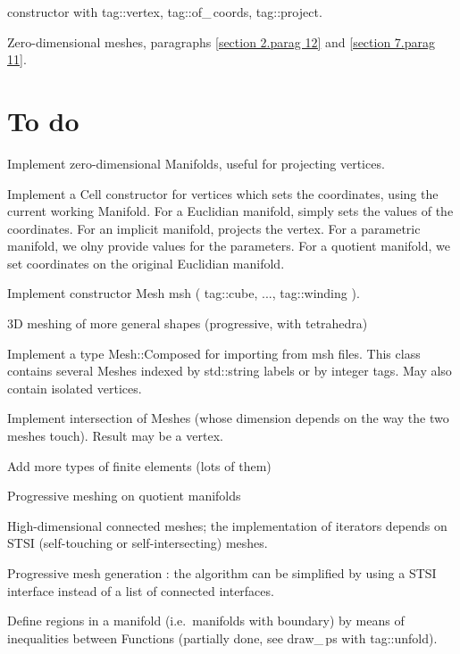 \documentclass[a4paper]{scrreprt}
\def\numb{}
\newcommand\azul[1]{\textcolor{nova}{#1}}
\newcommand\verm[1]{\textcolor{manif}{#1}}
\renewcommand\tt{\normalfont\ttfamily}
\begin{document}
\noindent {\small\tt\verm{Cell}} constructor with {\small\tt\textcolor{tag}{tag}::vertex},
{\small\tt\textcolor{tag}{tag}::of\_\,coords}, {\small\tt\textcolor{tag}{tag}::project}.

\noindent Zero-dimensional meshes, paragraphs \ref{\numb section 2.\numb parag 12} and
\ref{\numb section 7.\numb parag 11}.


\section*{To do}

Implement zero-dimensional {\small\tt\verm{Manifold}}s, useful for projecting vertices.

Implement a {\small\tt\verm{Cell}} constructor for vertices which sets the coordinates,
using the current working {\small\tt\verm{Manifold}}.
For a Euclidian manifold, simply sets the values of the coordinates.
For an implicit manifold, projects the vertex.
For a parametric manifold, we olny provide values for the parameters.
For a quotient manifold, we set coordinates on the original Euclidian manifold.

\noindent Implement constructor {\small\tt\verm{Mesh}} {\small\tt \azul{msh}} {\small\tt (}
{\small\tt\textcolor{tag}{tag}::cube,} {\small\tt ...,} {\small\tt\textcolor{tag}{tag}::winding}
{\small\tt )}.

\noindent 3D meshing of more general shapes (progressive, with tetrahedra)

\noindent Implement a type {\small\tt\verm{Mesh}::Composed} for importing from 
{\small\tt msh} files.
This class contains several {\small\tt\verm{Mesh}}es indexed by {\small\tt std::string}
labels or by integer tags.
May also contain isolated vertices.

\noindent Implement intersection of {\small\tt\verm{Mesh}}es (whose dimension depends on the
way the two meshes touch).
Result may be a vertex.

\noindent Add more types of finite elements (lots of them)

\noindent Progressive meshing on quotient manifolds

\noindent High-dimensional connected meshes; the implementation of iterators depends
on STSI (self-touching or self-intersecting) meshes.

\noindent Progressive mesh generation : the algorithm can be simplified by using
a STSI interface instead of a list of connected interfaces.

\noindent Define regions in a manifold (i.e.\ manifolds with boundary) by means of
inequalities between {\small\tt\verm{Function}}s (partially done, see {\small\tt draw\_\,ps}
with {\small\tt\textcolor{tag}{tag}::unfold}).
\end{document}
